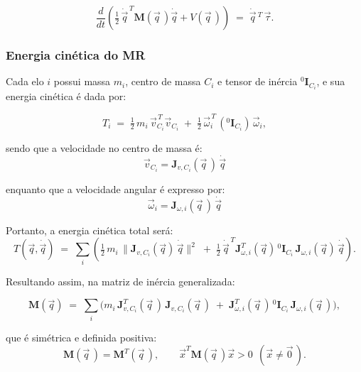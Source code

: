 \begin{equation}
\frac{d}{dt}\!\left(
    \tfrac12\,\dot{\vec q}^{\,T}\mathbf M(\vec q\, )\dot{\vec q} + V(\vec q\, )\right)
\;=\;
\dot{\vec q}\, ^T\,\vec \tau.
\label{eq:energy_balance}
\end{equation}

\subsubsection{Energia cinética do MR}
\label{sec:MR_energia_cinetica}

Cada elo $i$ possui massa $m_i$, centro de massa $C_i$ e tensor de inércia ${}^{0}\!\mathbf I_{C_i}$, e sua energia cinética é dada por:

\begin{equation}
\label{eq:energia_elos}
T_i
\;=\;
\tfrac12\, m_i \,\vec v_{C_i}^{\,T}\vec v_{C_i}
\;+\; \tfrac12\, \vec \omega_i^{\,T}\, ({}^{0}\!\mathbf I_{C_i}) \, \vec \omega_i,
\end{equation}

sendo que a velocidade no centro de massa é:
\begin{equation}
\vec v_{C_i}
=
\mathbf J_{v,C_i}(\vec q\,)\,\dot{\vec q}
\end{equation}

enquanto que a velocidade angular é expresso por:
\begin{equation}
\vec \omega_i
=
\mathbf J_{\omega,i}(\vec q\, )\,\dot{\vec q}
\end{equation}

Portanto, a energia cinética total será:
\begin{equation}
\label{eq:T_soma_links}
T(\vec q,\dot{\vec q})
\;=\;
\sum_i \left(\tfrac12\, m_i\,\|\mathbf J_{v,C_i}(\vec q)\,\dot{\vec q}\|^2 \;+\; \tfrac12\, \dot{\vec q}^{\,T}\mathbf J_{\omega,i}^{T}(\vec q)\,{}^{0}\!\mathbf I_{C_i}\,\mathbf J_{\omega,i}(\vec q)\,\dot{\vec q}\right).
\end{equation}

Resultando assim, na matriz de inércia generalizada:

\begin{equation}
\label{eq:definicao_Mq}
\mathbf M(\vec q)
\;=\;
\sum_i \Big(m_i\,\mathbf J_{v,C_i}^{T}(\vec q\,)\,\mathbf J_{v,C_i}(\vec q\, ) \;+\; \mathbf J_{\omega,i}^{T}(\vec q\, )\,{}^{0}\!\mathbf I_{C_i}\,\mathbf J_{\omega,i}(\vec q\, )\Big),
\end{equation}

que é simétrica e definida positiva:
\begin{equation}
\mathbf M(\vec q\, )=\mathbf M^{T}(\vec q\, ), 
\qquad
\vec x^{T}\mathbf M(\vec q\, )\vec x>0 \ \ (\vec x\neq \vec 0\, ).
\end{equation}